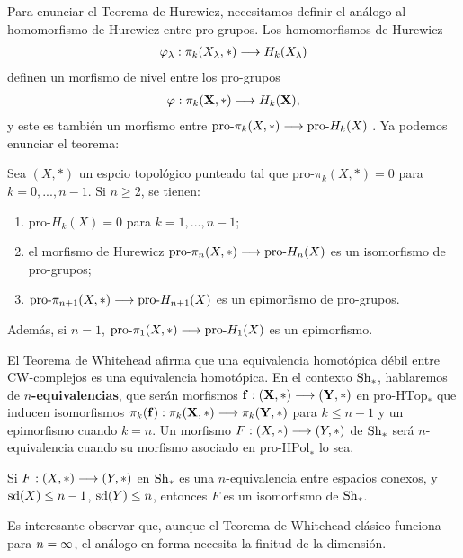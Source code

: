 Para enunciar el Teorema de Hurewicz, necesitamos definir el análogo al homomorfismo de Hurewicz entre pro-grupos. Los homomorfismos de Hurewicz 
\begin{gather*}
  \varphi_\lambda: \pi_k(X_\lambda,*)\longrightarrow H_k(X_\lambda )
\end{gather*}
definen un morfismo de nivel entre los pro-grupos 
\begin{gather*}
  \mathbf{\varphi }:\pi_k(\mathbf{X},\mathbf{*})\longrightarrow H_k(\mathbf{X}   ), 
\end{gather*}
y este es también un morfismo entre $ \text{pro-}\pi_k(X,*)\longrightarrow\text{pro-}H_k(X)  $ \cite[p. 135]{mardešić1982shape}. Ya podemos enunciar el teorema:

\begin{theorem}[Hurewicz]
  Sea $ (X,*) $ un espcio topológico punteado tal que $ \text{pro-}\pi_k(X,*) = 0 $ para $ k=0,...,n-1  $. Si $ n\geq 2 $, se tienen:
  \begin{enumerate}
    \item $ \text{pro-}H_k(X) = 0 $ para $ k=1,...,n-1 $;
    \item el morfismo de Hurewicz $  \text{pro-}\pi_n(X,*)\longrightarrow\text{pro-}H_n(X) $ es un isomorfismo de pro-grupos;
    \item $ \text{pro-}\pi_{n+1}(X,*)\longrightarrow\text{pro-}H_{n+1}(X)  $ es un epimorfismo de pro-grupos.
  \end{enumerate}
  Además, si $ n=1 $, $ \text{pro-}\pi_1(X,*)\longrightarrow\text{pro-}H_1(X)  $ es un epimorfismo.
\end{theorem}

El Teorema de Whitehead afirma que una equivalencia homotópica débil entre CW-complejos es una equivalencia homotópica. En el contexto $ \operatorname{Sh}_*  $, hablaremos de \textbf{$ n  $-equivalencias}, que serán morfismos $ \mathbf{f}:(\mathbf{X},*)\longrightarrow (\mathbf{Y},*) $ en $ \text{pro-HTop}_* $  que inducen isomorfismos $ \pi_k(\mathbf{f}):\pi_k(\mathbf{X},\mathbf{*})\longrightarrow \pi_k(\mathbf{Y},\mathbf{*})$ para $ k\leq n-1 $ y un epimorfismo cuando $ k=n$. Un morfismo $ F:(X,*)\longrightarrow(Y,*) $ de $ \operatorname{Sh}_* $ será $ n$-equivalencia cuando su morfismo asociado en $ \text{pro-HPol}_* $ lo sea.

\begin{theorem}[Whitehead]
  Si $ F:(X,*)\longrightarrow(Y,*) $ en $ \operatorname{Sh}_*  $ es una $ n  $-equivalencia entre espacios conexos, y $ \operatorname{sd}(X)\leq n-1  $, $ \operatorname{sd}(Y)\leq n  $, entonces $ F  $ es un isomorfismo de $ \operatorname{Sh}_* $.
\end{theorem}

Es interesante observar que, aunque el Teorema de Whitehead clásico funciona para $ n = \infty $, el análogo en forma necesita la finitud de la dimensión.